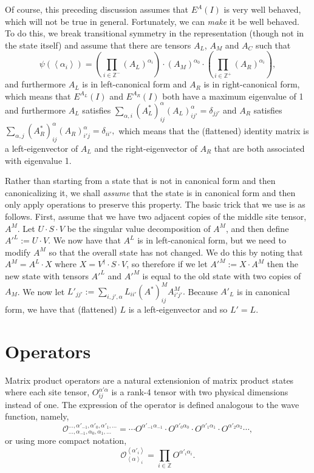 \documentclass{article}
\newcommand{\paren}[1]{\left(#1\right)}
\newcommand{\seq}[1]{\left<#1\right>}
\newcommand{\Z}{\mathbb{Z}}
\begin{document}
Of course, this preceding discussion assumes that $E^A(I)$ is very well behaved, which will not be true in general.  Fortunately, we can \emph{make} it be well behaved.  To do this, we break transitional symmetry in the representation (though not in the state itself) and assume that there are tensors $A_L$, $A_M$ and $A_C$ such that \begin{equation}
\label{eq:newform}
\psi(\seq{\alpha_i}) = \paren{\prod_{i\in\Z^-}(A_L)^{\alpha_i}}\cdot (A_M)^{\alpha_0}\cdot \paren{\prod_{i\in\Z^+}(A_R)^{\alpha_i}},\end{equation}
and furthermore $A_L$ is in left-canonical form and $A_R$ is in right-canonical form, which means that $E^{A_L}(I)$ and $E^{A_R}(I)$ both have a maximum eigenvalue of 1 and furthermore $A_L$ satisfies $\sum_{\alpha,i}(A_L^*)^{\alpha}_{ij}(A_L)^{\alpha}_{ij'}=\delta_{jj'}$ and $A_R$ satisfies $\sum_{\alpha,j}(A_R^*)^{\alpha}_{ij}(A_R)^{\alpha}_{i'j}=\delta_{ii'},$  which means that the (flattened) identity matrix is a left-eigenvector of $A_L$ and the right-eigenvector of $A_R$ that are both associated with eigenvalue 1.

Rather than starting from a state that is not in canonical form and then canonicalizing it, we shall \emph{assume} that the state is in canonical form and then only apply operations to preserve this property.  The basic trick that we use is as follows.  First, assume that we have two adjacent copies of the middle site tensor, $A^M$.  Let $U\cdot S\cdot V$ be the singular value decomposition of $A^M$, and then define $A'^L:=U\cdot V$.  We now have that $A^L$ is in left-canonical form, but we need to modify $A^M$ so that the overall state has not changed.  We do this by noting that $A^M=A^L\cdot X$ where $X=V^\dagger\cdot S\cdot V$, so therefore if we let $A'^M:= X\cdot A^M$ then the new state with tensors $A'^L$ and $A'^M$ is equal to the old state with two copies of $A_M$.  We now let $L'_{jj'}:=\sum_{i,j',\alpha}L_{ii'}(A^*)^M_{ij} A^M_{i'j'}.$  Because $A'_L$ is in canonical form, we have that (flattened) $L$ is a left-eigenvector and so $L'=L$.

\section{Operators}

Matrix product operators are a natural extensionion of matrix product states where each site tensor, $O^{\alpha'\alpha}_{ij}$ is a rank-4 tensor with two physical dimensions instead of one.  The expression of the operator is defined analogous to the wave function, namely,$$\mathcal{O}^{\dots,\alpha'_{-1},\alpha'_{0},\alpha'_1,\dots}_{\dots,\alpha_{-1},\alpha_{0},\alpha_1,\dots}= \cdots O^{\alpha'_{-1}\alpha_{-1}} \cdot O^{\alpha'_{0}\alpha_{0}}\cdot O^{\alpha'_{1}\alpha_{1}}\cdot O^{\alpha'_{2}\alpha_{2}}\cdots,$$ or using more compact notation,
$$\mathcal{O}^{\seq{\alpha'_i}}_{\seq{\alpha}_i} = \prod_{i\in\Z} O^{\alpha'_i\alpha_i}.$$
\end{document}
